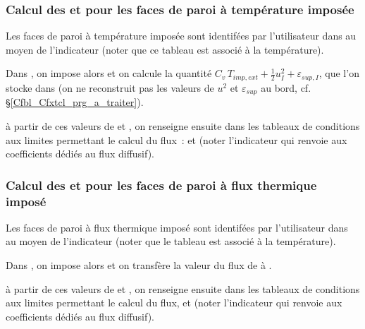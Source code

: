 \subsubsection*{Calcul des  et  pour les faces de paroi
à température imposée}

Les  faces de paroi   à température imposée sont identifées par
l'utilisateur dans  au moyen de  l'indicateur
 (noter que
ce tableau est associé à la température).

Dans , on impose alors  et
on calcule la quantité
$C_v\,T_{imp,ext}+\frac{1}{2}u^2_{I}+\varepsilon_{sup,I}$, que l'on
stocke dans  (on ne reconstruit pas les
valeurs de $u^2$ et $\varepsilon_{sup}$ au bord, cf. \S\ref{Cfbl_Cfxtcl_prg_a_traiter}).

à partir de ces valeurs de  et ,
on renseigne ensuite dans 
les tableaux de conditions aux limites  permettant le calcul du flux~:
 et
 (noter
l'indicateur  qui renvoie aux coefficients dédiés au flux
diffusif).


\subsubsection*{Calcul des  et  pour les faces de paroi
à flux thermique imposé}

Les  faces de paroi   à flux thermique
imposé sont identifées par
l'utilisateur dans  au moyen de  l'indicateur
 (noter que le tableau est
associé à la température).

Dans , on impose alors  et
on transfère la valeur du flux de  
à .

à partir de ces valeurs de  et ,
on renseigne ensuite dans  les tableaux de conditions aux limites
permettant le calcul du flux,
 et
 (noter
l'indicateur  qui renvoie aux coefficients dédiés au flux
diffusif).

